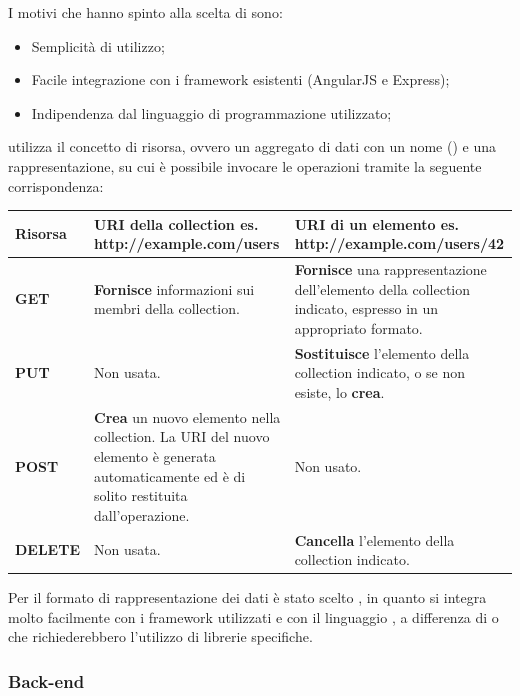 I motivi che hanno spinto alla scelta di  sono:
\begin{itemize}
	\item Semplicità di utilizzo;
	\item Facile integrazione con i framework esistenti (AngularJS e Express);
	\item Indipendenza dal linguaggio di programmazione utilizzato;
\end{itemize}

 utilizza il concetto di risorsa, ovvero un aggregato di dati con un nome () e una rappresentazione, su cui è possibile invocare le operazioni  tramite la seguente corrispondenza:

\begingroup
\renewcommand*{\arraystretch}{1.5}
\begin{tabularx}{\textwidth}{|P{2.5cm}|X|X|}
\hline
	\textbf{Risorsa} & \textbf{URI della collection} \newline es. http://example.com/users & \textbf{URI di un elemento} \newline es. http://example.com/users/42 \\
\hline
	\textbf{GET} & \textbf{Fornisce} informazioni sui membri della collection. & \textbf{Fornisce} una rappresentazione dell'elemento della collection indicato, espresso in un appropriato formato. \\
\hline
	\textbf{PUT} & Non usata. & \textbf{Sostituisce} l'elemento della collection indicato, o se non esiste, lo \textbf{crea}. \\
\hline
	\textbf{POST} & \textbf{Crea} un nuovo elemento nella collection. La URI del nuovo elemento è generata automaticamente ed è di solito restituita dall'operazione. & Non usato. \\
\hline
	\textbf{DELETE} & Non usata. & \textbf{Cancella} l'elemento della collection indicato. \\
\hline
\end{tabularx}
\endgroup

Per il formato di rappresentazione dei dati è stato scelto , in quanto si integra molto facilmente con i framework utilizzati e con il linguaggio , a differenza di  o  che richiederebbero l'utilizzo di librerie specifiche.


\subsubsection{Back-end}

